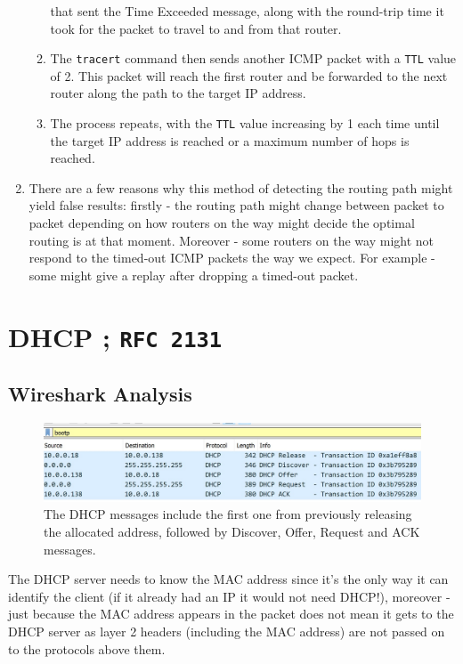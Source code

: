 \begin{enumerate}[label=\alph*.]
\begin{enumerate}[label=\arabic*.]
		 that sent the Time Exceeded message, along with the round-trip time it took for the packet to travel to and from that router.
		\item The \texttt{tracert} command then sends another ICMP packet with a
		\texttt{TTL} value of 2. This packet will reach the first router and be forwarded to the next router along the path to the target IP address.
		\item The process repeats, with the \texttt{TTL} value increasing by 1 each
		 time until the target IP address is reached or a maximum number of hops is reached.
	\end{enumerate}
	\item There are a few reasons why this method of detecting the routing path might yield
	false results: firstly - the routing path might change between packet to packet
	depending on how routers on the way might decide the optimal routing is at that moment.
	Moreover - some routers on the way might not respond to the timed-out ICMP packets the way we expect.
	For example - some might give a replay after dropping a timed-out packet.
\end{enumerate}

\section{DHCP ; \texttt{RFC 2131}}
\subsection{Wireshark Analysis}
\begin{figure}
	\includegraphics[width=1.2 \textwidth]{Resources/dhcp_ws.jpeg}
	\caption{The DHCP messages include the first one from previously releasing
	the allocated address, followed by Discover, Offer, Request and ACK messages.}
\end{figure}
The DHCP server needs to know the MAC address since it's
the only way it can identify the client (if it already had an IP
it would not need DHCP!), moreover - just because the
MAC address appears in the packet does not mean it gets to the DHCP server
as layer 2 headers (including the MAC address) are not passed on to
the protocols above them.

